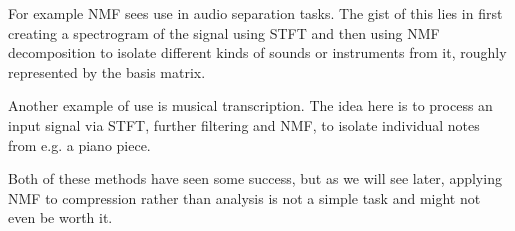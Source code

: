 For example NMF sees use in audio separation tasks. \cite{fevotte_audio_separation_2017} The gist of this lies in first creating a spectrogram of the signal using STFT and then using NMF decomposition to isolate different kinds of sounds or instruments from it, roughly represented by the basis matrix.

Another example of use is musical transcription. \cite{recoskie_mann_2014} The idea here is to process an input signal via STFT, further filtering and NMF, to isolate individual notes from e.g. a piano piece.

Both of these methods have seen some success, but as we will see later, applying NMF to compression rather than analysis is not a simple task and might not even be worth it.


